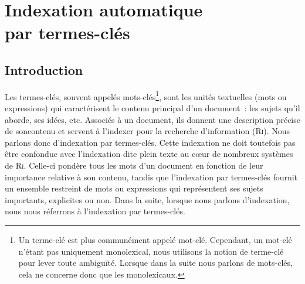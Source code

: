 \chapter[Indexation automatique par termes-clés]{Indexation automatique\\par termes-clés}
\label{chap:main-state_of_the_art}

  \section{Introduction}
  \label{sec:main-state_of_the_art-introduction}
    Les termes-clés,
    souvent appelés mots-clés\footnote{Un terme-clé est plus communément appelé
    mot-clé. Cependant, un mot-clé n'étant pas uniquement monolexical, nous
    utilisons la notion de terme-clé pour lever toute ambiguïté. Lorsque dans la
    suite nous parlons de mots-clés, cela ne concerne donc que les
    monolexicaux.}, sont les unités textuelles (mots ou expressions) qui
    caractérisent le contenu principal d'un document~: les sujets qu'il aborde,
    ses idées, etc. Associés à un document, ils donnent une description précise
    de soncontenu et servent à l'indexer pour la recherche d'information
    (\textsc{Ri}). Nous parlons donc d'indexation par
    termes-clés. Cette indexation ne doit
    toutefois pas être confondue avec l'indexation dite \og{}plein texte\fg{} au
    c\oe{}ur de nombreux systèmes de \textsc{Ri}. Celle-ci pondère tous les mots
    d'un document en fonction de leur importance relative à son contenu, tandis
    que l'indexation par termes-clés fournit un ensemble restreint de mots ou
    expressions qui représentent ses sujets importants, explicites ou non. Dans
    la suite, lorsque nous parlons d'indexation, nous nous réferrons à
    l'indexation par termes-clés.

